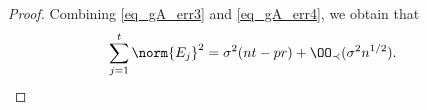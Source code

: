 \documentclass[aos,preprint]{imsart}
\begin{document}
\begin{proof}
	Combining \eqref{eq_gA_err3} and \eqref{eq_gA_err4}, we obtain that 
	\begin{align*}%
		\sum_{j=1}^t \norm{E_j}^2 &=\sigma^2 (nt-pr)+  \OO_\prec(\sigma^2 n^{1/2} ).
	\end{align*}
%
 


\end{proof}
\end{document}
